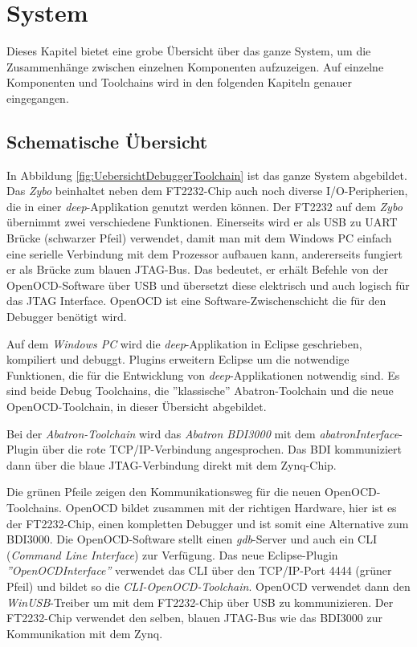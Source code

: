 \chapter{System}
Dieses Kapitel bietet eine grobe Übersicht über das ganze System, um die Zusammenhänge zwischen einzelnen Komponenten aufzuzeigen.
Auf einzelne Komponenten und Toolchains wird in den folgenden Kapiteln genauer eingegangen.


\section{Schematische Übersicht}
In Abbildung \ref{fig:UebersichtDebuggerToolchain} ist das ganze System abgebildet.
Das \textit{Zybo} beinhaltet neben dem FT2232-Chip auch noch diverse I/O-Peripherien, die in einer \textit{deep}-Applikation genutzt werden können.
Der FT2232 auf dem \textit{Zybo} übernimmt zwei verschiedene Funktionen.
Einerseits wird er als USB zu UART Brücke (schwarzer Pfeil) verwendet, damit man mit dem Windows PC einfach eine serielle Verbindung mit dem Prozessor aufbauen kann, andererseits fungiert er als Brücke zum blauen JTAG-Bus.
Das bedeutet, er erhält Befehle von der OpenOCD-Software über USB und übersetzt diese elektrisch und auch logisch für das JTAG Interface.
OpenOCD ist eine Software-Zwischenschicht die für den Debugger benötigt wird.

Auf dem \textit{Windows PC} wird die \textit{deep}-Applikation in Eclipse geschrieben, kompiliert und debuggt.
Plugins erweitern Eclipse um die notwendige Funktionen, die für die Entwicklung von \textit{deep}-Applikationen notwendig sind.
Es sind beide Debug Toolchains, die ''klassische'' Abatron-Toolchain und die neue OpenOCD-Toolchain, in dieser Übersicht abgebildet.

Bei der \textit{Abatron-Toolchain} wird das \textit{Abatron BDI3000} mit dem \textit{abatronInterface}-Plugin über die rote TCP/IP-Verbindung angesprochen.
Das BDI kommuniziert dann über die blaue JTAG-Verbindung direkt mit dem Zynq-Chip.

Die grünen Pfeile zeigen den Kommunikationsweg für die neuen OpenOCD-Toolchains.
OpenOCD bildet zusammen mit der richtigen Hardware, hier ist es der FT2232-Chip, einen kompletten Debugger und ist somit eine Alternative zum BDI3000.
Die OpenOCD-Software stellt einen \textit{gdb}-Server und auch ein CLI (\textit{Command Line Interface}) zur Verfügung.
Das neue Eclipse-Plugin \textit{''OpenOCDInterface''} verwendet das CLI über den TCP/IP-Port 4444 (grüner Pfeil) und bildet so die \textit{CLI-OpenOCD-Toolchain}.
OpenOCD verwendet dann den \textit{WinUSB}-Treiber um mit dem FT2232-Chip über USB zu kommunizieren.
Der FT2232-Chip verwendet den selben, blauen JTAG-Bus wie das BDI3000 zur Kommunikation mit dem Zynq.

